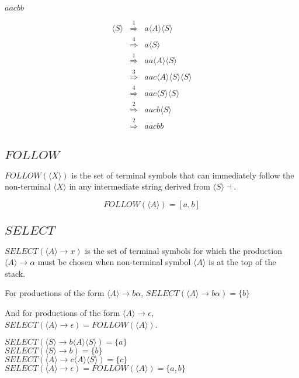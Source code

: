 \documentclass[a4paper,12pt]{article}
\newcommand{\nonterminal}[1]{\langle #1 \rangle}
\begin{document}
$aacbb$

\begin{eqnarray*}
\nonterminal{S}	&	\stackrel{1}{\Rightarrow}	&	a \nonterminal{A} \nonterminal{S}	\\
						&	\stackrel{4}{\Rightarrow}	&	a \nonterminal{S}							\\
						&	\stackrel{1}{\Rightarrow}	&	aa \nonterminal{A} \nonterminal{S}	\\
						&	\stackrel{3}{\Rightarrow}	&	aac \nonterminal{A} \nonterminal{S}	\nonterminal{S}\\
						&	\stackrel{4}{\Rightarrow}	&	aac \nonterminal{S} \nonterminal{S}	\\
						&	\stackrel{2}{\Rightarrow}	&	aacb \nonterminal{S}						\\
						&	\stackrel{2}{\Rightarrow}	&	aacbb											\\
\end{eqnarray*}

\subsection*{$FOLLOW$}

$FOLLOW(\nonterminal{X})$ is the set of terminal symbols that can
immediately follow the non-terminal $\nonterminal{X}$ in any
intermediate string derived from $\nonterminal{S} \dashv$.

\[ FOLLOW(\nonterminal{A}) = [a,b] \]

\subsection*{$SELECT$}

$SELECT(\nonterminal{A} \to x)$ is the set of terminal symbols for which
the production $\nonterminal{A} \to \alpha$ must be chosen when
non-terminal symbol $\nonterminal{A}$ is at the top of the stack.

For productions of the form $\nonterminal{A} \to b \alpha$, 
$SELECT(\nonterminal{A} \to b \alpha) = \{b\}$

And for productions of the form $\nonterminal{A} \to \epsilon$, 
$SELECT(\nonterminal{A} \to \epsilon) = FOLLOW(\nonterminal{A})$.

$SELECT(\nonterminal{S} \to b \nonterminal{A}\nonterminal{S}) = \{a\}$ \\
$SELECT(\nonterminal{S} \to b) = \{b\}$ \\
$SELECT(\nonterminal{A} \to c \nonterminal{A}\nonterminal{S}) = \{c\}$ \\
$SELECT(\nonterminal{A} \to \epsilon) = FOLLOW(\nonterminal{A}) = \{a,b\}$ \\
\end{document}

